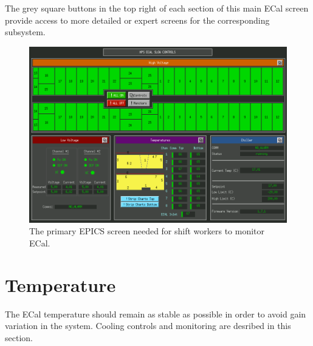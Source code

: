 \documentclass[12pt]{article}
\begin{document}
The grey square buttons in the top right of each section of this main ECal screen provide
access to more detailed or expert screens for the corresponding subsystem.


\begin{figure}[htbp]\centering
    \includegraphics[width=15.5cm]{pics/epics_ecal_all.png}
    \caption{The primary EPICS screen needed for shift workers to monitor ECal.\label{fig:ecal_all}}
\end{figure}

\newpage
\section{Temperature}
The ECal temperature should remain as stable as possible in order to avoid gain variation in the system.  Cooling controls and monitoring are desribed in this section.
\end{document}
